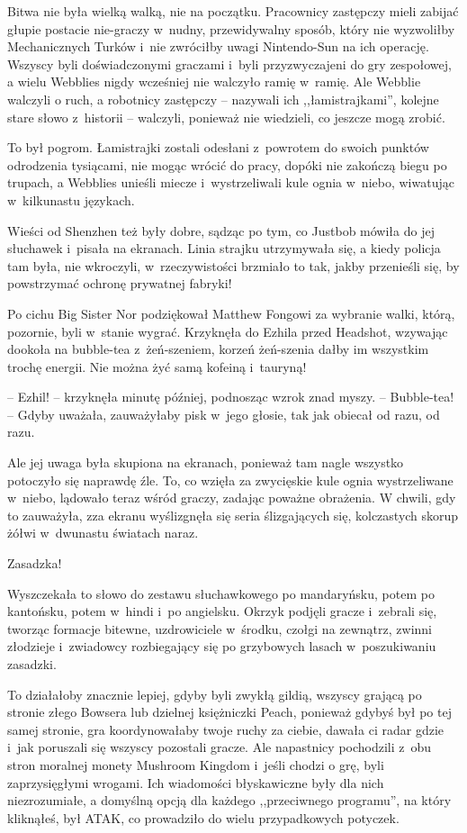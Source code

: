 \documentclass[oneside,polish,11pt,rmheadings]{mwbk}
\begin{document}
Bitwa nie była wielką walką, nie na początku. Pracownicy zastępczy mieli zabijać głupie postacie nie-graczy w~nudny, przewidywalny sposób, który nie wyzwoliłby Mechanicznych Turków i~nie zwróciłby uwagi Nintendo-Sun na ich operację. Wszyscy byli doświadczonymi graczami i~byli przyzwyczajeni do gry zespołowej, a wielu Webblies nigdy wcześniej nie walczyło ramię w~ramię. Ale Webblie walczyli o ruch, a robotnicy zastępczy -- nazywali ich ,,łamistrajkami'', kolejne stare słowo z~historii -- walczyli, ponieważ nie wiedzieli, co jeszcze mogą zrobić. 


To był pogrom. Łamistrajki zostali odesłani z~powrotem do swoich punktów odrodzenia tysiącami, nie mogąc wrócić do pracy, dopóki nie zakończą biegu po trupach, a Webblies unieśli miecze i~wystrzeliwali kule ognia w~niebo, wiwatując w~kilkunastu językach. 


Wieści od Shenzhen też były dobre, sądząc po tym, co Justbob mówiła do jej słuchawek i~pisała na ekranach. Linia strajku utrzymywała się, a kiedy policja tam była, nie wkroczyli, w~rzeczywistości brzmiało to tak, jakby przenieśli się, by powstrzymać ochronę prywatnej fabryki! 


Po cichu Big Sister Nor podziękował Matthew Fongowi za wybranie walki, którą, pozornie, byli w~stanie wygrać. Krzyknęła do Ezhila przed Headshot, wzywając dookoła na bubble-tea z~żeń-szeniem, korzeń żeń-szenia dałby im wszystkim trochę energii. Nie można żyć samą kofeiną i~tauryną! 


-- Ezhil! -- krzyknęła minutę później, podnosząc wzrok znad myszy. -- Bubble-tea! -- Gdyby uważała, zauważyłaby pisk w~jego głosie, tak jak obiecał od razu, od razu. 


Ale jej uwaga była skupiona na ekranach, ponieważ tam nagle wszystko potoczyło się naprawdę źle. To, co wzięła za zwycięskie kule ognia wystrzeliwane w~niebo, lądowało teraz wśród graczy, zadając poważne obrażenia. W chwili, gdy to zauważyła, zza ekranu wyślizgnęła się seria ślizgających się, kolczastych skorup żółwi w~dwunastu światach naraz. 


Zasadzka!


Wyszczekała to słowo do zestawu słuchawkowego po mandaryńsku, potem po kantońsku, potem w~hindi i~po angielsku. Okrzyk podjęli gracze i~zebrali się, tworząc formacje bitewne, uzdrowiciele w~środku, czołgi na zewnątrz, zwinni złodzieje i~zwiadowcy rozbiegający się po grzybowych lasach w~poszukiwaniu zasadzki. 


To działałoby znacznie lepiej, gdyby byli zwykłą gildią, wszyscy grającą po stronie złego Bowsera lub dzielnej księżniczki Peach, ponieważ gdybyś był po tej samej stronie, gra koordynowałaby twoje ruchy za ciebie, dawała ci radar gdzie i~jak poruszali się wszyscy pozostali gracze. Ale napastnicy pochodzili z~obu stron moralnej monety Mushroom Kingdom i~jeśli chodzi o grę, byli zaprzysięgłymi wrogami. Ich wiadomości błyskawiczne były dla nich niezrozumiałe, a domyślną opcją dla każdego ,,przeciwnego programu'', na który kliknąłeś, był ATAK, co prowadziło do wielu przypadkowych potyczek. 
\end{document}
